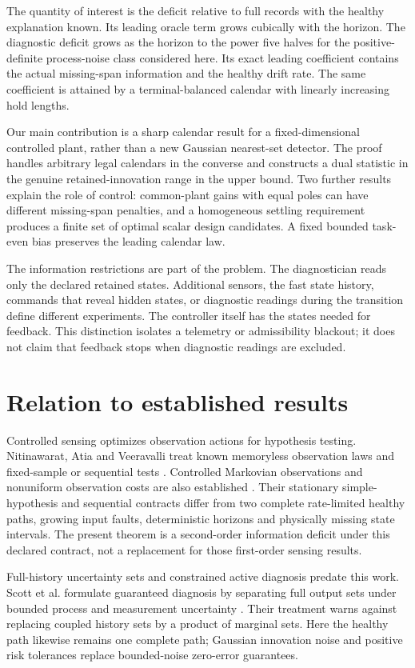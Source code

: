 \documentclass[11pt]{article}
\begin{document}
The quantity of interest is the deficit relative to full records with the healthy
explanation known. Its leading oracle term grows cubically with the horizon.
The diagnostic deficit grows as the horizon to the power five halves for the
positive-definite process-noise class considered here. Its exact leading
coefficient contains the actual missing-span information and the healthy drift
rate. The same coefficient is attained by a terminal-balanced calendar with
linearly increasing hold lengths.

Our main contribution is a sharp calendar result for a fixed-dimensional
controlled plant, rather than a new Gaussian nearest-set detector.
The proof handles arbitrary legal calendars in the converse and constructs a
dual statistic in the genuine retained-innovation range in the upper bound.
Two further results explain the role of control: common-plant gains with equal
poles can have different missing-span penalties, and a homogeneous settling
requirement produces a finite set of optimal scalar design candidates.
A fixed bounded task-even bias preserves the leading calendar law.

The information restrictions are part of the problem. The diagnostician reads
only the declared retained states. Additional sensors, the fast state history,
commands that reveal hidden states, or diagnostic readings during the transition
define different experiments. The controller itself has the states needed for
feedback. This distinction isolates a telemetry or admissibility blackout; it
does not claim that feedback stops when diagnostic readings are excluded.

\section{Relation to established results}
Controlled sensing optimizes observation actions for hypothesis testing.
Nitinawarat, Atia and Veeravalli treat known memoryless observation laws and
fixed-sample or sequential tests \cite{controlled}.
Controlled Markovian observations and nonuniform observation costs are also
established \cite{markov}. Their stationary simple-hypothesis and sequential
contracts differ from two complete rate-limited healthy paths, growing input
faults, deterministic horizons and physically missing state intervals.
The present theorem is a second-order information deficit under this declared
contract, not a replacement for those first-order sensing results.

Full-history uncertainty sets and constrained active diagnosis predate this work.
Scott et al. formulate guaranteed diagnosis by separating full output sets under
bounded process and measurement uncertainty \cite{zonotope}.
Their treatment warns against replacing coupled history sets by a product of
marginal sets. Here the healthy path likewise remains one complete path;
Gaussian innovation noise and positive risk tolerances replace bounded-noise
zero-error guarantees.
\end{document}
